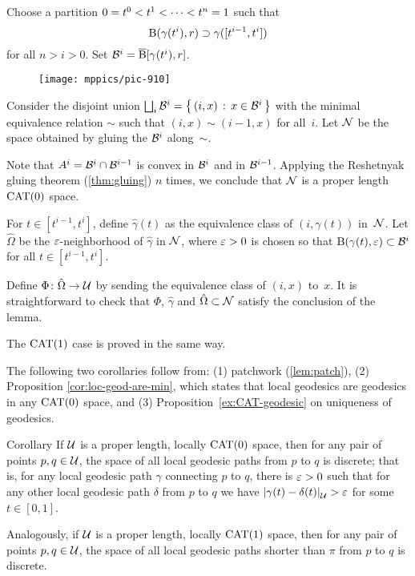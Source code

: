 
Choose a partition $0\z=t^0<t^1<\dots<t^n\z=1$ such that 
\[\mathrm{B}{}(\gamma(t^i),r)\supset \gamma([t^{i-1},t^i])\] for all $n>i>0$.
Set $\mathcal{B}^i=\overline{\mathrm{B}}{}[\gamma(t^i),r]$.

\begin{figure}[h!]
\vskip-0mm
\centering
\texttt{[image: mppics/pic-910]}
\end{figure}

Consider the disjoint union $\bigsqcup_i\mathcal{B}^i=\left\{\,{(i,x)}\,:\,{x\in\mathcal{B}^i}\,\right\}$ with the minimal equivalence relation $\sim$ such that $(i,x)\sim(i-1,x)$ for all~$i$.
Let  $\mathcal{N}$ be the space obtained by gluing the $\mathcal{B}^i$ along~$\sim$.

Note that $A^i=\mathcal{B}^i\cap\mathcal{B}^{i-1}$ is convex in $\mathcal{B}^i$ and in $\mathcal{B}^{i-1}$.
Applying the Reshetnyak gluing theorem (\ref{thm:gluing}) $n$ times, 
we conclude that $\mathcal{N}$ is a proper length $\mathrm{CAT}(0)$ space.

For $t\in[t^{i-1},t^i]$, define $\hat\gamma(t)$ as the equivalence class of $(i,\gamma(t))$ in~$\mathcal{N}$.
Let $\hat\Omega$ be the $\varepsilon$-neighborhood of $\hat\gamma$ in $\mathcal{N}$, where $\varepsilon>0$ is chosen so that $\mathrm{B}{}(\gamma(t),\varepsilon)\subset\mathcal{B}^i$ for all $t\in[t^{i-1},t^i]$.

Define $\Phi\colon\hat\Omega\to\mathcal{U}$
by sending the equivalence class of $(i,x)$ to~$x$.
It is straightforward to check that $\Phi$, 
$\hat\gamma$ and $\hat\Omega\subset\mathcal{N}$ satisfy the conclusion of  the lemma.

The $\mathrm{CAT}(1)$ case is proved in the same way.
\qeds

The following two corollaries follow from:
(1) patchwork (\ref{lem:patch}),
(2) Proposition \ref{cor:loc-geod-are-min}, which states that local geodesics are geodesics in any $\mathrm{CAT}(0)$ space, 
and (3) Proposition~\ref{ex:CAT-geodesic} on uniqueness of geodesics.

\begin{thm}{Corollary}\label{cor:discrete-paths}
If $\mathcal{U}$ is a proper length, locally $\mathrm{CAT}(0)$ space, then for any pair of points $p,q\in\mathcal{U}$, the space of all local geodesic paths from $p$ to $q$ is discrete;
that is, for any local geodesic path $\gamma$ connecting $p$ to $q$, there is $\varepsilon>0$ such that for any other local geodesic path $\delta$ from $p$ to $q$ we have
$\dist{\gamma(t)}{\delta(t)}{\spc{U}}>\eps$ for some $t\in[0,1]$.

Analogously, if $\mathcal{U}$ is a proper length, locally $\mathrm{CAT}(1)$ space, then for any pair of points $p,q\in\mathcal{U}$,  the space of all local geodesic paths shorter than $\pi$ from $p$ to $q$ is discrete.
\end{thm}

